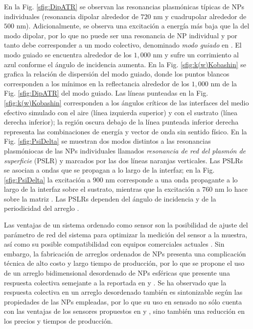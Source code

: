 \documentclass[letterpaper,11pt] {article}
\begin{document}
	
En la Fig.  \ref{sfig:DipATR}  se observan las resonancias plasmónicas típicas de NPs individuales (resonancia dipolar alrededor de $720$ nm y cuadrupolar alrededor de $500$ nm).  Adicionalmente, se observa una excitación a energía más baja que la del modo dipolar, por lo que no puede ser una resonancia de NP individual y por tanto debe corresponder a un modo colectivo, denominado \emph{modo guiado} en  \cite{kabashin2009plasmonic}.  El modo guiado se encuentra alrededor de los $1,000$ nm y sufre un corrimiento al azul conforme el ángulo de incidencia aumenta.  En la Fig.  \ref{sfig:k(w)Kobashin} se grafica la relación de dispersión del modo guiado, donde los puntos blancos corresponden a los mínimos en la reflectancia alrededor de los $1,000$ nm de la Fig.  \ref{sfig:DipATR} del modo guiado.  Las líneas punteadas en la Fig.   \ref{sfig:k(w)Kobashin} corresponden a los ángulos críticos de las interfaces del medio efectivo simulado con el aire (línea izquierda superior) y con el sustrato (línea derecha inferior); la región oscura debajo de la línea punteada inferior derecha representa las combinaciones de energía y vector de onda sin sentido físico.  En la Fig.  \ref{sfig:PsiDelta} se muestran dos modos distintos a las resonancias plasmóniocas de las NPs individuales llamados \emph{resonancia de red del plasmón de superficie} (PSLR) \cite{danilov2018ultra} y marcados por las dos líneas naranjas verticales.  Las PSLRs se asocian a ondas que se propagan a lo largo de la interfaz; en la Fig.  \ref{sfig:PsiDelta} la excitación a $900$ nm corresponde a una onda propagante a lo largo de la interfaz sobre el  sustrato, mientras que la excitación a $760$ nm lo hace sobre la matriz \cite{danilov2018ultra}.  Las PSLRs dependen del  ángulo de incidencia y de la periodicidad del arreglo \cite{danilov2018ultra}.   

Las ventajas de un sistema ordenado como sensor son la posibilidad de ajuste del parámetro de red del sistema para optimizar la medición del sensor a la muestra, así como su posible compatibilidad con equipos comerciales actuales \cite{kabashin2009plasmonic}.  Sin embargo, la fabricaci\'on de arreglos ordenados de NPs presenta una complicaci\'on t\'ecnica de alto costo y largo tiempo de producción, por lo que se propone el uso de un arreglo bidimensional desordenado de NPs esféricas que presente una respuesta colectiva semejante a la reportada en \cite{kabashin2009plasmonic} y \cite{danilov2018ultra}.  Se ha observado que la respuesta colectiva en un arreglo desordenado también es sintonizable según las propiedades de las NPs empleadas, por lo que su uso en sensado no sólo cuenta con las ventajas de los sensores propuestos en \cite{kabashin2009plasmonic} y \cite{danilov2018ultra}, sino también una reducción en los precios y tiempos de producción. 
\end{document}
